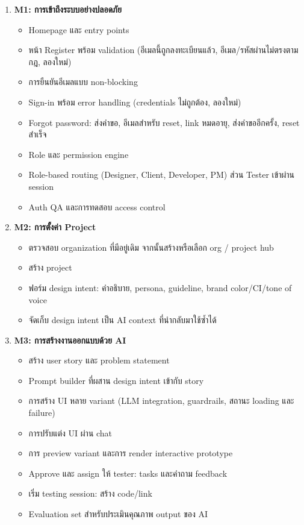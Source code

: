 \documentclass[a4paper,oneside]{cpe-thesis-th}
\begin{document}
\begin{enumerate}
  \item \textbf{M1: การเข้าถึงระบบอย่างปลอดภัย}
    \begin{itemize}
      \item Homepage และ entry points
      \item หน้า Register พร้อม validation (อีเมลนี้ถูกลงทะเบียนแล้ว, อีเมล/รหัสผ่านไม่ตรงตามกฎ, ลองใหม่)
      \item การยืนยันอีเมลแบบ non-blocking
      \item Sign-in พร้อม error handling (credentials ไม่ถูกต้อง, ลองใหม่)
      \item Forgot password: ส่งคำขอ, อีเมลสำหรับ reset, link หมดอายุ, ส่งคำขออีกครั้ง, reset สำเร็จ
      \item Role และ permission engine
      \item Role-based routing (Designer, Client, Developer, PM) ส่วน Tester เข้าผ่าน session
      \item Auth QA และการทดสอบ access control
    \end{itemize}

  \item \textbf{M2: การตั้งค่า Project}
    \begin{itemize}
      \item ตรวจสอบ organization ที่มีอยู่เดิม จากนั้นสร้างหรือเลือก org / project hub
      \item สร้าง project
      \item ฟอร์ม design intent: คำอธิบาย, persona, guideline, brand color/CI/tone of voice
      \item จัดเก็บ design intent เป็น AI context ที่นำกลับมาใช้ซ้ำได้
    \end{itemize}

  \item \textbf{M3: การสร้างงานออกแบบด้วย AI}
    \begin{itemize}
      \item สร้าง user story และ problem statement
      \item Prompt builder ที่ผสาน design intent เข้ากับ story
      \item การสร้าง UI หลาย variant (LLM integration, guardrails, สถานะ loading และ failure)
      \item การปรับแต่ง UI ผ่าน chat
      \item การ preview variant และการ render interactive prototype
      \item Approve และ assign ให้ tester: tasks และคำถาม feedback
      \item เริ่ม testing session: สร้าง code/link
      \item Evaluation set สำหรับประเมินคุณภาพ output ของ AI
    \end{itemize}


\end{enumerate}
\end{document}
